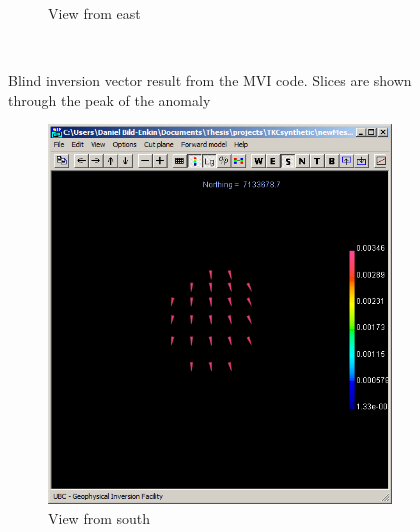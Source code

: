 \begin{figure}
\begin{subfigure}[b]{0.5\textwidth}
        \caption{View from east}
        \label{fig:blindMVIeastFld}
    \end{subfigure}
    ~ %
   \caption{Blind inversion vector result from the \ac{MVI} code. Slices are shown through the peak of the anomaly}
   \label{fig:blindMVIFld}
\end{figure}

\begin{figure}
    \centering
    \begin{subfigure}[b]{0.3\textwidth}
        \includegraphics[width=\textwidth]{images/TKC/blindMVIsouthFldIso.PNG}
        \caption{View from south}
        \label{fig:blindMVIsouthFldIso}
    \end{subfigure}
    ~ %
    \begin{subfigure}[b]{0.3\textwidth}

\end{subfigure}
\end{figure}
